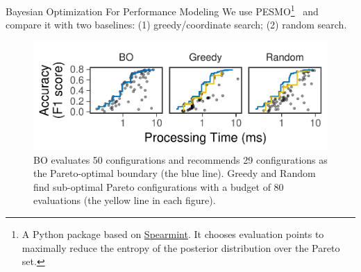 \begin{frame}{Bayesian Optimization For Performance Modeling}
  \vspace{1em} We use PESMO\footnote{A Python package based on
    \href{https://github.com/HIPS/Spearmint}{Spearmint}. It chooses evaluation
    points to maximally reduce the entropy of the posterior distribution over
    the Pareto set.}~\cite{hernandez2016predictive} and compare it with two
  baselines: (1) greedy/coordinate search; (2) random search.

  \pause
  \begin{figure}
    \centering
    \includegraphics[width=0.95\linewidth]{figures/serving-eval-bo.pdf}
    \caption{BO evaluates 50 configurations and recommends 29 configurations as
      the Pareto-optimal boundary (the blue line). Greedy and Random find
      sub-optimal Pareto configurations with a budget of 80 evaluations (the
      yellow line in each figure).}
  \end{figure}
\end{frame}

